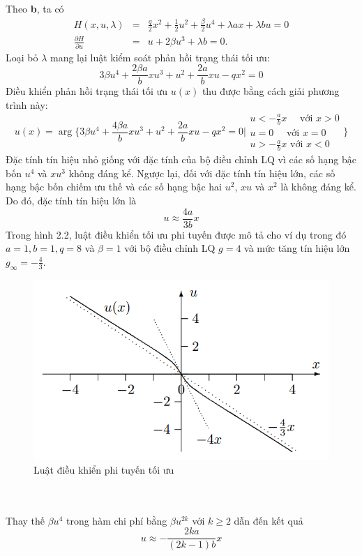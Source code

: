 \documentclass[12pt,a4paper]{report}
\begin{document}
Theo \textbf{b}, ta có 
\begin{eqnarray}
	H(x, u, \lambda) &=& \frac{q}{2}x^2 + \frac{1}{2}u^2 + \frac{\beta}{2}u^4 + \lambda ax + \lambda bu = 0 \nonumber \\ \frac{\partial H}{\partial u} &=& u + 2\beta u^3 + \lambda b = 0. \nonumber
\end{eqnarray} Loại bỏ $\lambda$ mang lại luật kiểm soát phản hồi trạng thái tối ưu: $$3\beta u^4 + \frac{2\beta a}{b}xu^3 + u^2 + \frac{2a}{b}xu - qx^2 = 0$$ Điều khiển phản hồi trạng thái tối ưu $u(x)$ thu được bằng cách giải phương trình này: $$u(x) = \arg \Bigg\{3\beta u^4 + \frac{4\beta a}{b}xu^3 + u^2 + \frac{2a}{b}xu - qx^2 = 0 \Bigg| \begin{matrix}
u<-\frac{a}{b}x \quad \text{ với } x > 0\\ u = 0 \quad \text{ với } x = 0 \\ u > -\frac{a}{b}x \text{ với } x < 0
\end{matrix}\Bigg\}$$ Đặc tính tín hiệu nhỏ giống với đặc tính của bộ điều chỉnh LQ vì các số hạng bậc bốn $u^4$ và $xu^3$ không đáng kể. Ngược lại, đối với đặc tính tín hiệu lớn, các số hạng bậc bốn chiếm ưu thế và các số hạng bậc hai $u^2$, $xu$ và $x^2$ là không đáng kể. Do đó, đặc tính tín hiệu lớn là $$u \approx \frac{4a}{3b}x$$ Trong hình 2.2, luật điều khiển tối ưu phi tuyến được mô tả cho ví dụ trong đó $a = 1, b = 1, q = 8$ và $\beta = 1$ với bộ điều chỉnh LQ $g = 4$ và mức tăng tín hiệu lớn $g_{\infty} = - \frac{4}{3}$.
\begin{figure}[h]
	\centering
	\includegraphics[scale=.6]{hinh2ct.png}
	\caption{Luật điều khiển phi tuyến tối ưu}
\end{figure}\\\\
Thay thế $\beta u^4$ trong hàm chi phí bằng $\beta u^{2k}$ với $k \geq 2$ dẫn đến kết quả $$u\approx -\frac{2ka}{(2k-1)b}x$$
\end{document}
